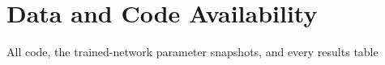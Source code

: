 \documentclass{article}
\begin{document}

\section*{Data and Code Availability}
%
All code, the trained-network parameter snapshots, and every results table
\end{document}
